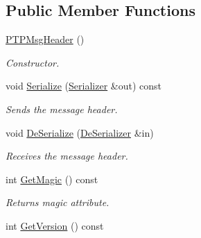 \subsection*{Public Member Functions}
\begin{DoxyCompactItemize}
\item 
\hypertarget{class_common_1_1_p_t_p_msg_header_a8e462bd4d4e7f337d11ce6bde2ab21af}{\hyperlink{class_common_1_1_p_t_p_msg_header_a8e462bd4d4e7f337d11ce6bde2ab21af}{P\-T\-P\-Msg\-Header} ()}\label{class_common_1_1_p_t_p_msg_header_a8e462bd4d4e7f337d11ce6bde2ab21af}

\begin{DoxyCompactList}\small\item\em Constructor. \end{DoxyCompactList}\item 
\hypertarget{class_common_1_1_p_t_p_msg_header_a4da3b559025cac427ae10171df35e565}{void \hyperlink{class_common_1_1_p_t_p_msg_header_a4da3b559025cac427ae10171df35e565}{Serialize} (\hyperlink{class_common_1_1_serializer}{Serializer} \&out) const }\label{class_common_1_1_p_t_p_msg_header_a4da3b559025cac427ae10171df35e565}

\begin{DoxyCompactList}\small\item\em Sends the message header. \end{DoxyCompactList}\item 
\hypertarget{class_common_1_1_p_t_p_msg_header_a3e83b41befc2b74efc829d676387e42e}{void \hyperlink{class_common_1_1_p_t_p_msg_header_a3e83b41befc2b74efc829d676387e42e}{De\-Serialize} (\hyperlink{class_common_1_1_de_serializer}{De\-Serializer} \&in)}\label{class_common_1_1_p_t_p_msg_header_a3e83b41befc2b74efc829d676387e42e}

\begin{DoxyCompactList}\small\item\em Receives the message header. \end{DoxyCompactList}\item 
\hypertarget{class_common_1_1_p_t_p_msg_header_a51dff8298e5ce6622fe29f2d4d7b2d38}{int \hyperlink{class_common_1_1_p_t_p_msg_header_a51dff8298e5ce6622fe29f2d4d7b2d38}{Get\-Magic} () const }\label{class_common_1_1_p_t_p_msg_header_a51dff8298e5ce6622fe29f2d4d7b2d38}

\begin{DoxyCompactList}\small\item\em Returns magic attribute. \end{DoxyCompactList}\item 
\hypertarget{class_common_1_1_p_t_p_msg_header_a96d687830243b5e736372343e1039bf1}{int \hyperlink{class_common_1_1_p_t_p_msg_header_a96d687830243b5e736372343e1039bf1}{Get\-Version} () const }\label{class_common_1_1_p_t_p_msg_header_a96d687830243b5e736372343e1039bf1}


\end{DoxyCompactItemize}

